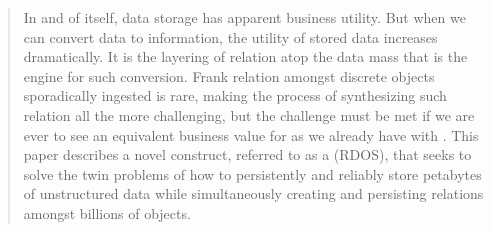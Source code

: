 \begin{abstract}

In and of itself, data storage has apparent business utility. But when we can convert data to information, the utility of stored data increases dramatically. It is the layering of relation atop the data mass that is the engine for such conversion. Frank relation amongst discrete objects sporadically ingested is rare, making the process of synthesizing such relation all the more challenging, but the challenge must be met if we are ever to see an equivalent business value for \ud{} as we already have with \sd{}. This paper describes a novel construct, referred to as a \RDOS{} (RDOS), that seeks to solve the twin problems of how to persistently and reliably store petabytes of unstructured data while simultaneously creating and persisting relations amongst billions of objects.

\end{abstract}
